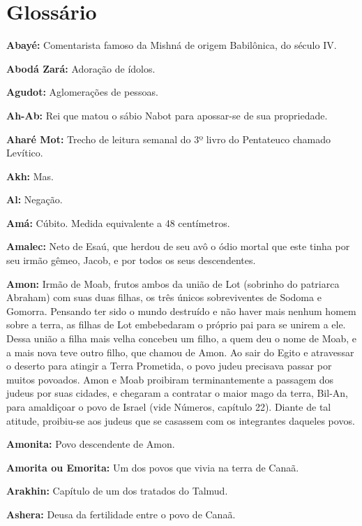 \setcounter{secnumdepth}{-2}

\chapter{Glossário}

\begin{hangparas}{.25in}{1}
{\small

\textbf{Abayé:} Comentarista famoso da Mishná de origem Babilônica, do
século IV.

\textbf{Abodá Zará:} Adoração de ídolos.

\textbf{Agudot:} Aglomerações de pessoas.

\textbf{Ah-Ab:} Rei que matou o sábio Nabot para apossar-se de sua propriedade.

\textbf{Aharé Mot:} Trecho de leitura semanal do 3º livro do Pentateuco chamado Levítico.

\textbf{Akh:} Mas.

\textbf{Al:} Negação.

\textbf{Amá:} Cúbito. Medida equivalente a 48 centímetros.

\textbf{Amalec:} Neto de Esaú, que herdou de seu avô o ódio mortal que
este tinha por seu irmão gêmeo, Jacob, e por todos os seus
descendentes.

\textbf{Amon:} Irmão de Moab, frutos ambos da união de Lot (sobrinho do
patriarca Abraham) com suas duas filhas, os três únicos sobreviventes
de Sodoma e Gomorra. Pensando ter sido o mundo destruído e não haver
mais nenhum homem sobre a terra, as filhas de Lot embebedaram o próprio
pai para se unirem a ele. Dessa união a filha mais velha concebeu um
filho, a quem deu o nome de Moab, e a mais nova teve outro filho, que
chamou de Amon. Ao sair do Egito e atravessar o deserto para atingir a
Terra Prometida, o povo judeu precisava passar por muitos povoados.
Amon e Moab proibiram terminantemente a passagem dos judeus por suas
cidades, e chegaram a contratar o maior mago da terra, Bil-An, para
amaldiçoar o povo de Israel (vide Números, capítulo 22). Diante de tal
atitude, proibiu-se aos judeus que se casassem com os integrantes
daqueles povos.

\textbf{Amonita:} Povo descendente de Amon.

\textbf{Amorita ou Emorita:} Um dos povos que vivia na terra de Canaã.

\textbf{Arakhin:} Capítulo de um dos tratados do Talmud.

\textbf{Ashera:} Deusa da fertilidade entre o povo de Canaã.

}
\end{hangparas}
